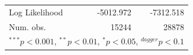 \documentclass[doc,natbib,12pt]{apa6}\usepackage[]{graphicx}\usepackage[]{color}
\begin{document}
\begin{table}[h!!]
\begin{center}
\begin{footnotesize}
\begin{tabular}{l D{)}{)}{13)7} D{)}{)}{13)7} }
Log Likelihood                                                & -5012.972                   & -7312.518                  \\
Num. obs.                                                     & 15244                       & 28878                      \\
\bottomrule
{}
\end{tabular}
\end{footnotesize}
\label{table:coefficients}
\end{center}
\end{table}

    
\end{document}

